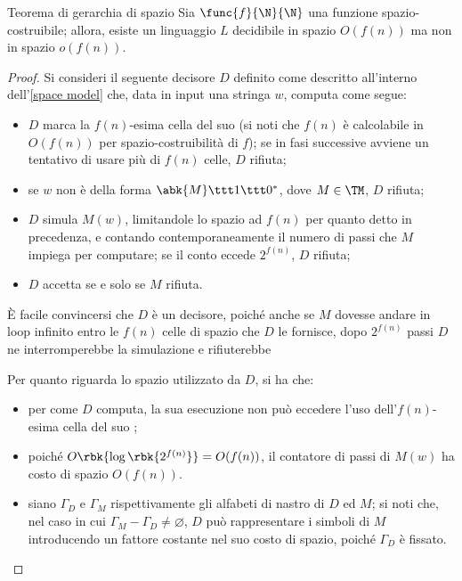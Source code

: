 \documentclass[a4paper, 12pt]{report}
\begin{document}
    \begin{framedthm}[label={hier space thm}]{Teorema di gerarchia di spazio}
        Sia $\func{f}{\N}{\N}$ una funzione spazio-costruibile; allora, esiste un linguaggio $L$ decidibile in spazio $O(f(n))$ ma non in spazio $o(f(n))$.
    \end{framedthm}

    \begin{proof}
        Si consideri il seguente decisore $D$ definito come descritto all'interno dell'\cref{space model} che, data in input una stringa $w$, computa come segue:

        \begin{itemize}
            \item $D$ marca la $f(n)$-esima cella del suo  (si noti che $f(n)$ è calcolabile in $O(f(n))$ per spazio-costruibilità di $f$); se in fasi successive avviene un tentativo di usare più di $f(n)$ celle, $D$ rifiuta;
            \item se $w$ non è della forma $\abk{M} \ttt 1 \ttt 0^*$, dove $M \in \TM$, $D$ rifiuta;
            \item $D$ simula $M(w)$, limitandole lo spazio ad $f(n)$ per quanto detto in precedenza, e contando contemporaneamente il numero di passi che $M$ impiega per computare; se il conto eccede $2^{f(n)}$, $D$ rifiuta;
            \item $D$ accetta se e solo se $M$ rifiuta.
        \end{itemize}

        È facile convincersi che $D$ è un decisore, poiché anche se $M$ dovesse andare in loop infinito entro le $f(n)$ celle di spazio che $D$ le fornisce, dopo $2^{f(n)}$ passi $D$ ne interromperebbe la simulazione e rifiuterebbe

        Per quanto riguarda lo spazio utilizzato da $D$, si ha che:

        \begin{itemize}
            \item per come $D$ computa, la sua esecuzione non può eccedere l'uso dell'$f(n)$-esima cella del suo ;
            \item poiché $O \rbk{\log \rbk{2^{f(n)}}} = O(f(n))$, il contatore di passi di $M(w)$ ha costo di spazio $O(f(n))$.
            \item siano $\Gamma_D$ e $\Gamma_M$ rispettivamente gli alfabeti di nastro di $D$ ed $M$; si noti che, nel caso in cui $\Gamma_M - \Gamma_D \neq \varnothing$, $D$ può rappresentare i simboli di $M$ introducendo un fattore costante nel suo costo di spazio, poiché $\Gamma_D$ è fissato.
        \end{itemize}


\end{proof}
\end{document}
